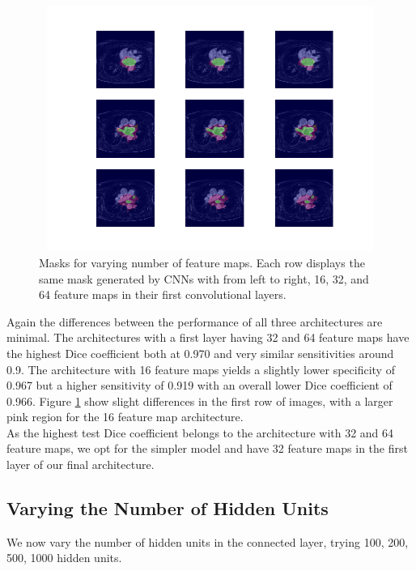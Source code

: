 \begin{figure}
\centering
\includegraphics[trim=2.5cm 1.5cm 2cm 1.5cm, clip=true, height=80mm, width=150mm]{Chapter3/mask_results_varying_number_of_feature_maps.png}
\caption{Masks for varying number of feature maps. Each row displays the same mask generated by CNNs with from left to right, 16, 32, and 64 feature maps in their first convolutional layers.}
\label{mask_varying_feature_maps}
\end{figure}

\noindent Again the differences between the performance of all three architectures are minimal. The architectures with a first layer having 32 and 64 feature maps have the highest Dice coefficient both at 0.970 and very similar sensitivities around 0.9. The architecture with 16 feature maps yields a slightly lower specificity of 0.967 but a higher sensitivity of 0.919 with an overall lower Dice coefficient of 0.966. Figure \ref{mask_varying_feature_maps} show slight differences in the first row of images, with a larger pink region for the 16 feature map architecture. \\

\noindent As the highest test Dice coefficient belongs to the architecture with 32 and 64 feature maps, we opt for the simpler model and have 32 feature maps in the first layer of our final architecture.

\subsection{Varying the Number of Hidden Units}

\noindent We now vary the number of hidden units in the connected layer, trying 100, 200, 500, 1000 hidden units. \\

